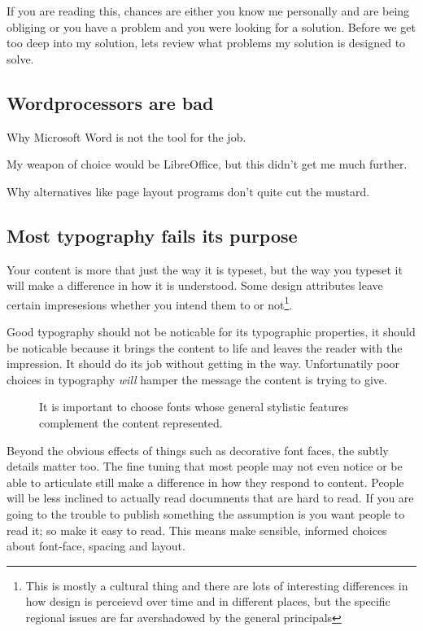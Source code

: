 \documentclass[12pt]{scrartcl}
\newcommand{\pdfsample}[4]{%
		\begin{figure}[h]
			\centering
			\begin{minipage}[b]{.45\textwidth}
				\raggedleft
				\shadowbox{\texttt{[image: \#2]}}
			\end{minipage}\hspace{2\columnsep}
			\begin{minipage}[b]{.45\textwidth}
				\caption{#3}
				\label{fig:#4}
				\vspace{1ex}
			\end{minipage}
		\end{figure}
	}
\begin{document}
If you are reading this, chances are either you know me personally and are being
obliging or you have a problem and you were looking for a solution. Before we
get too deep into my solution, lets review what problems my solution is designed
to solve.

\subsection{Wordprocessors are bad}

Why Microsoft Word is not the tool for the job.

My weapon of choice would be LibreOffice, but this didn't get me much further.

Why alternatives like page layout programs don't quite cut the mustard.

\subsection{Most typography fails its purpose}

Your content is more that just the way it is typeset, but the way you typeset it
will make a difference in how it is understood. Some design attributes leave
certain impresesions whether you intend them to or not\footnote{This is mostly a
	cultural thing and there are lots of interesting differences in how
	design is perceievd over time and in different places, but the specific
	regional issues are far avershadowed by the general principals}.

Good typography should not be noticable for its typographic properties, it
should be noticable because it brings the content to life and leaves the reader
with the impression. It should do its job without getting in the way.
Unfortunatily poor choices in typography \emph{will} hamper the message the
content is trying to give.


\pdfsample{2}{../gallery/fontsmatter.pdf}{It is important to choose fonts whose general stylistic features complement the content represented.}{fontsmatter2}

Beyond the obvious effects of things such as decorative font faces, the subtly
details matter too. The fine tuning that most people may not even notice or be
able to articulate still make a difference in how they respond to content.
People will be less inclined to actually read documnents that are hard to read.
If you are going to the trouble to publish something the assumption is you want
people to read it; so make it easy to read. This means make sensible, informed
choices about font-face, spacing and layout.
\end{document}

